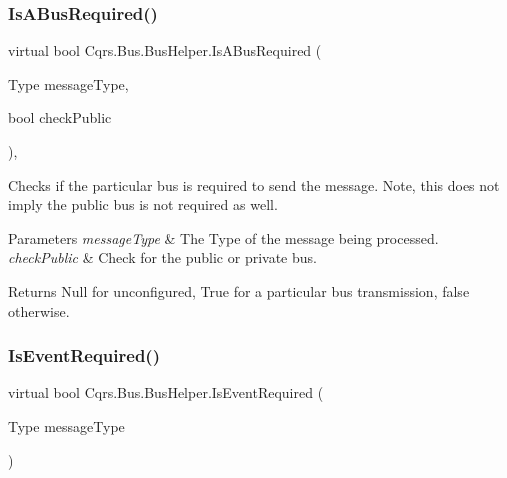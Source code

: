\subsubsection{\texorpdfstring{Is\+A\+Bus\+Required()}{IsABusRequired()}}
{\footnotesize\ttfamily virtual bool Cqrs.\+Bus.\+Bus\+Helper.\+Is\+A\+Bus\+Required (\begin{DoxyParamCaption}\item[{Type}]{message\+Type,  }\item[{bool}]{check\+Public }\end{DoxyParamCaption})\hspace{0.3cm}{\ttfamily [protected]}, {\ttfamily [virtual]}}



Checks if the particular bus is required to send the message. Note, this does not imply the public bus is not required as well. 


\begin{DoxyParams}{Parameters}
{\em message\+Type} & The Type of the message being processed.\\
\hline
{\em check\+Public} & Check for the public or private bus.\\
\hline
\end{DoxyParams}
\begin{DoxyReturn}{Returns}
Null for unconfigured, True for a particular bus transmission, false otherwise.
\end{DoxyReturn}
\mbox{\label{classCqrs_1_1Bus_1_1BusHelper_a28c675e976adbf348637ec6ff6410c1a_a28c675e976adbf348637ec6ff6410c1a}} 
\subsubsection{\texorpdfstring{Is\+Event\+Required()}{IsEventRequired()}\hspace{0.1cm}{\footnotesize\ttfamily [1/2]}}
{\footnotesize\ttfamily virtual bool Cqrs.\+Bus.\+Bus\+Helper.\+Is\+Event\+Required (\begin{DoxyParamCaption}\item[{Type}]{message\+Type }\end{DoxyParamCaption})\hspace{0.3cm}{\ttfamily [virtual]}}



